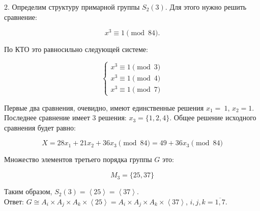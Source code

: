 2. Определим структуру примарной группы $S_2(3)$. Для этого нужно решить сравнение:

$$x^3 \equiv 1 \pmod{84}.$$

По КТО это равносильно следующей системе:

\begin{equation*}
	\begin{cases}
	x^3 \equiv 1 \pmod 3 \\
	x^3 \equiv 1 \pmod 4 \\
	x^3 \equiv 1 \pmod 7
	\end{cases}
\end{equation*}

Первые два сравнения, очевидно, имеют единственные решения $x_1 =~1$, $x_2 = 1$. Последнее сравнение имеет 3 решения: $x_3 = \{1, 2, 4\}$. Общее решение исходного сравнения будет равно:

$$X = 28 x_1 + 21 x_2 + 36 x_3 \pmod {84} = 49 + 36 x_3 \pmod {84}$$

Множество элементов третьего порядка группы $G$ это:

$$M_3 = \{25, 37\}$$

Таким образом, $S_2(3) = \left\langle 25 \right\rangle = \left\langle 37 \right\rangle$. \\

\noindent Ответ: $G \cong A_i \times A_j \times A_k \times \left\langle 25 \right\rangle = A_i \times A_j \times A_k \times \left\langle 37 \right\rangle$, $i, j, k = \overline{1, 7}$. 
